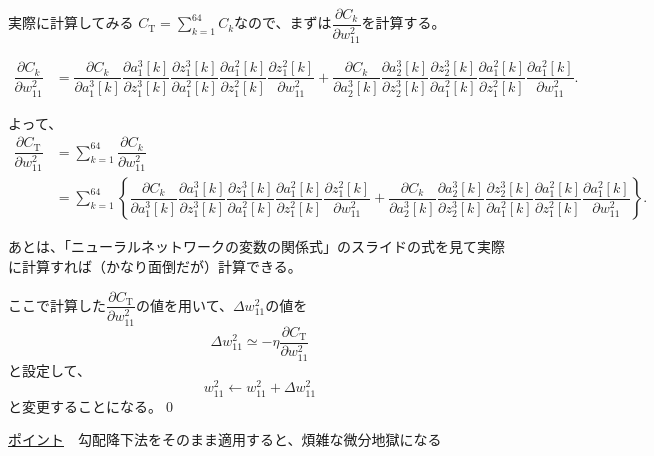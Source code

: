 \documentclass[dvipdfmx,aspectratio=169]{beamer}
\begin{document}
	\begin{frame}[allowframebreaks]{実際に計算してみる}
		$ C_\mathrm{T} = \displaystyle\sum_{k=1}^{64} C_k $なので、まずは$ \dfrac{\partial C_k}{\partial w^2_{11}} $を計算する。
		
		\begin{align*}
			\dfrac{\partial C_k}{\partial w^2_{11}} 
				&= \dfrac{\partial C_k}{\partial a^3_1[k]}\dfrac{\partial a^3_1[k]}{\partial z^3_1[k]}\dfrac{\partial z^3_1[k]}{\partial a^2_1[k]}\dfrac{\partial a^2_1[k]}{\partial z^2_1[k]}\dfrac{\partial z^2_1[k]}{\partial w^2_{11}}+\dfrac{\partial C_k}{\partial a^3_2[k]}\dfrac{\partial a^3_2[k]}{\partial z^3_2[k]}\dfrac{\partial z^3_2[k]}{\partial a^2_1[k]}\dfrac{\partial a^2_1[k]}{\partial z^2_1[k]}\dfrac{\partial a^2_1[k]}{\partial w^2_{11}}.
		\end{align*}
		
		よって、
		\begin{align*}
			\dfrac{\partial C_\mathrm{T}}{\partial w^2_{11}} 
				&= \sum_{k=1}^{64} \dfrac{\partial C_k}{\partial w^2_{11}}\\
				&= \sum_{k=1}^{64}\left\{ \dfrac{\partial C_k}{\partial a^3_1[k]}\dfrac{\partial a^3_1[k]}{\partial z^3_1[k]}\dfrac{\partial z^3_1[k]}{\partial a^2_1[k]}\dfrac{\partial a^2_1[k]}{\partial z^2_1[k]}\dfrac{\partial z^2_1[k]}{\partial w^2_{11}} + \dfrac{\partial C_k}{\partial a^3_2[k]}\dfrac{\partial a^3_2[k]}{\partial z^3_2[k]}\dfrac{\partial z^3_2[k]}{\partial a^2_1[k]}\dfrac{\partial a^2_1[k]}{\partial z^2_1[k]}\dfrac{\partial a^2_1[k]}{\partial w^2_{11}} \right\}.
		\end{align*}
	
		あとは、「ニューラルネットワークの変数の関係式」のスライドの式を見て実際に計算すれば（かなり面倒だが）計算できる。
		
		ここで計算した$ \dfrac{\partial C_\mathrm{T}}{\partial w^2_{11}} $の値を用いて、$ \Delta w^2_{11} $の値を
		\begin{equation*}
			\Delta w^2_{11} \simeq -\eta \dfrac{\partial C_\mathrm{T}}{\partial w^2_{11}}
		\end{equation*}
		と設定して、
		\begin{equation*}
			w^2_{11} \longleftarrow w^2_{11} + \Delta w^2_{11}
		\end{equation*}
		と変更することになる。\qed
		\vspace{3em}
		
		\underline{ポイント}　勾配降下法をそのまま適用すると、煩雑な微分地獄になる		
	\end{frame}
\end{document}
